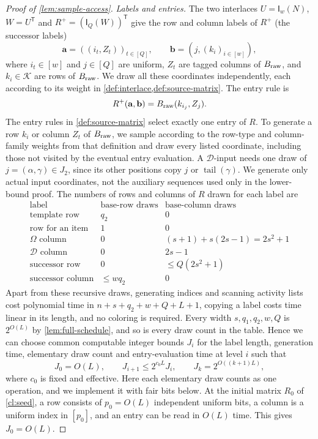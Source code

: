 \documentclass[11pt,letterpaper]{article} \usepackage[utf8]{inputenc}
\theoremstyle{plain} \newtheorem{theorem}{Theorem}[section]
\theoremstyle{definition} \newaliascnt{definition}{theorem}
\newcommand{\Int}[2]{\mathsf{I}_{#1}(#2)}
\begin{document}
\begin{proof}[Proof of \cref{lem:sample-access}]
\emph{Labels and entries.}
The two interlaces $U=\Int{w}{N}$, $W=U^{\mathsf T}$ and
$R^+=(\Int{Q}{W})^{\mathsf T}$ give the row and column labels of $R^+$ (the successor labels)
\[
\mathbf a=((i_t,Z_t))_{t\in[Q]},\qquad
\mathbf b=(j,(k_i)_{i\in[w]}),
\]
where $i_t\in[w]$ and $j\in[Q]$ are uniform, $Z_t$ are tagged columns of $B_{\rm raw}$,
and $k_i\in\mathcal K$ are rows of $B_{\rm raw}$. We draw all these coordinates independently, each according to its weight
in \cref{def:interlace,def:source-matrix}. The entry rule is
\[
R^+(\mathbf a,\mathbf b)=B_{\rm raw}(k_{i_j},Z_j).
\]
The entry rules in \cref{def:source-matrix} select exactly one entry of
$R$. To generate a row $k_i$ or column $Z_t$ of $B_{\rm raw}$, we sample according to the row-type and column-family weights from that
definition and draw every listed coordinate, including those not visited by
the eventual entry evaluation. A $\mathcal D$-input needs one draw of $j=(\alpha,\gamma)\in J_2$, since its
other positions copy $j$ or $\operatorname{tail}(\gamma)$.
We generate only actual input coordinates, not the auxiliary sequences used
only in the lower-bound proof. The numbers of rows and columns of $R$ drawn
for each label are
\[
\begin{array}{c|c|c}
\text{label}&\text{base-row draws}&\text{base-column draws}\\ \hline
\text{template row}&q_2&0\\
\text{row for an item}&1&0\\
\Omega\text{ column}&0&(s+1)+s(2s-1)=2s^2+1\\
\mathcal D\text{ column}&0&2s-1\\
\text{successor row}&0&\le Q(2s^2+1)\\
\text{successor column}&\le wq_2&0
\end{array}
\]
Apart from these recursive draws, generating indices and scanning activity
lists cost polynomial time in $n+s+q_2+w+Q+L+1$, copying a label costs time
linear in its length, and no coloring is required. Every width $s,q_1,q_2,w,Q$ is $2^{O(L)}$ by
\cref{lem:full-schedule}, and so is every draw count in the table. Hence we can choose common computable integer bounds $J_i$ for
the label length, generation time, elementary draw count and entry-evaluation
time at level $i$ such that
\[
J_0=O(L),\qquad J_{i+1}\le2^{c_0L}J_i,\qquad
J_k=2^{O((k+1)L)},
\]
where $c_0$ is fixed and effective. Here each elementary draw counts as one
operation, and we implement it with fair bits below. At the initial matrix $R_0$ of \cref{cl:seed},
a row consists of $p_0=O(L)$ independent uniform bits, a column is a uniform index in
$[p_0]$, and an entry can be read in $O(L)$ time. This gives $J_0=O(L)$.


\end{proof}
\end{document}
